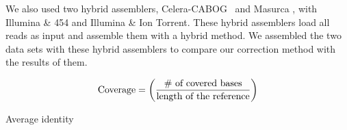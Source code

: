 \documentclass{llncs}
\begin{document}
We also used two hybrid assemblers, Celera-CABOG~\cite{cabogMiller:2008} and Masurca \cite{masurcaZimin:2013}, with Illumina \& 454 and Illumina \& Ion Torrent. These hybrid assemblers load all reads as input and assemble them with a hybrid method. We assembled the two data sets with these hybrid assemblers to compare our correction method with the results of them. 


\begin{equation}
\label{eqn:coverage}
\textnormal{Coverage} = \left(\frac{\textnormal{\#{ }of{ }covered{ }bases}}{\textnormal{length of the reference}}\right)
\end{equation}



\begin{algorithm}
\caption{Average identity} %
\label{alg:avgident}
\begin{algorithmic}
  \\
  \\
  \ENDWHILE
\end{algorithmic}
\end{algorithm}
\end{document}
